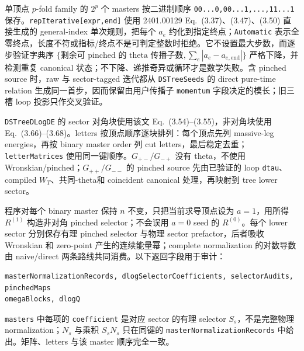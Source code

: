 ﻿\documentclass[a4paper,11pt]{article}
\begin{document}
单顶点 $p$-fold family 的 $2^p$ 个 masters 按二进制顺序 \texttt{00...0,00...1,...,11...1} 保存。\texttt{repIterative[expr,end]} 使用 2401.00129 Eq.~(3.37)、(3.47)、(3.50) 直接生成的 general-index 单次规则，把每个 $a_e$ 约化到指定终点；\texttt{Automatic} 表示全零终点，长度不符或指标/终点不是可判定整数时拒绝。它不设置最大步数，而逐步验证字典序
$\{\text{剩余可 pinched 的 theta 传播子数},\sum_e|a_e-a_{e,\mathrm{end}}|\}$ 严格下降，并检测重复 canonical 状态；不下降、递推奇异或循环才是数学失败。含 pinched source 时，raw 与 sector-tagged 迭代都从 \texttt{DSTreeSeeds} 的 direct pure-time relation 生成同一首步，因而保留由用户传播子 \texttt{momentum} 字段决定的模长；旧三槽 loop 投影只作交叉验证。

\texttt{DSTreeDLogDE} 的 sector 对角块使用该文 Eq.~(3.54)--(3.55)，非对角块使用 Eq.~(3.66)--(3.68)。letters 按顶点顺序逐块排列：每个顶点先列 massive-leg energies，再按 binary master order 列 cut letters，最后稳定去重；\texttt{letterMatrices} 使用同一键顺序。$G_{+-}/G_{-+}$ 没有 theta，不使用 Wronskian/pinched；$G_{++}/G_{--}$ 的 pinched source 先由已验证的 loop \texttt{dtau}、compiled $W_T$、共同-theta和 coincident canonical 处理，再映射到 tree lower sector。

程序对每个 binary master 保持 $n$ 不变，只把当前求导顶点设为 $a=1$，用所得 $R^{(1)}$ 构造非对角 pinched selector；不会误用 $a=0$ seed 的 $R^{(0)}$。每个 lower sector 分别保存有理 pinched selector 与物理 sector prefactor，后者吸收 Wronskian 和 zero-point 产生的连续能量幂；complete normalization 的对数导数由 naive/direct 两条路线共同消费。以下返回字段用于审计：
\begin{verbatim}
masterNormalizationRecords, dlogSelectorCoefficients, selectorAudits, pinchedMaps
omegaBlocks, dlogQ
\end{verbatim}
\texttt{masters} 中每项的 \texttt{coefficient} 是对应 sector 的有理 selector $S_s$，不是完整物理 normalization；$N_s$ 与乘积 $S_sN_s$ 只在同键的 \texttt{masterNormalizationRecords} 中给出。矩阵、letters 与该 master 顺序完全一致。
\end{document}
